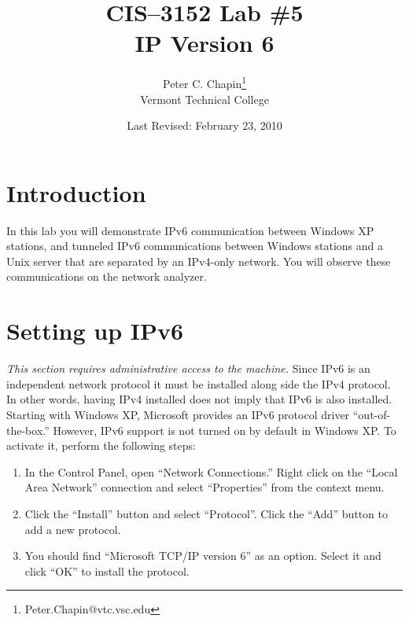 \documentclass[twocolumn]{article}
\begin{document}
\title{CIS--3152 Lab \#5\\IP Version 6}
\author{Peter C. Chapin\thanks{Peter.Chapin@vtc.vsc.edu}\\
  Vermont Technical College}
\date{Last Revised: February 23, 2010}
\maketitle

\section{Introduction}

In this lab you will demonstrate IPv6 communication between Windows XP stations, and tunneled
IPv6 communications between Windows stations and a Unix server that are separated by an
IPv4-only network. You will observe these communications on the network analyzer.

\section{Setting up IPv6}

\emph{This section requires administrative access to the machine.} Since IPv6 is an independent
network protocol it must be installed along side the IPv4 protocol. In other words, having IPv4
installed does not imply that IPv6 is also installed. Starting with Windows XP, Microsoft
provides an IPv6 protocol driver ``out-of-the-box.'' However, IPv6 support is not turned on by
default in Windows XP. To activate it, perform the following steps:

\begin{enumerate}

\item In the Control Panel, open ``Network Connections.'' Right click on the ``Local Area
  Network'' connection and select ``Properties'' from the context menu.

\item Click the ``Install'' button and select ``Protocol''. Click the ``Add'' button to add a
  new protocol.

\item You should find ``Microsoft TCP/IP version 6'' as an option. Select it and click ``OK'' to
  install the protocol.

\end{enumerate}
\end{document}
